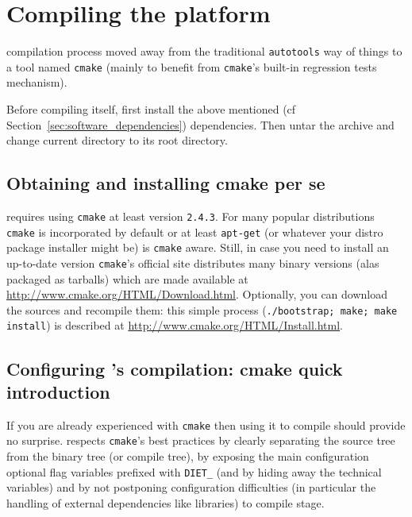 \section{Compiling the platform}
\label{sec:compil_platform}

\diet compilation process moved away from the traditional \verb+autotools+
way of things to a tool named \verb+cmake+ (mainly to benefit from
\verb+cmake+'s built-in regression tests mechanism).

Before compiling \diet itself, first install the above mentioned (cf
Section~\ref{sec:software_dependencies}) dependencies.  Then untar the
\diet archive and change current directory to its root directory.

\subsection{Obtaining and installing cmake per se}
\diet requires using \verb+cmake+ at least version \verb+2.4.3+.  For
many popular distributions \verb+cmake+ is incorporated by default or
at least \verb+apt-get+ (or whatever your distro package installer
might be) is \verb+cmake+ aware. Still, in case you need to install
an up-to-date version \verb+cmake+'s official site distributes many
binary versions (alas packaged as tarballs) which are made available
at \url{http://www.cmake.org/HTML/Download.html}. Optionally, you
can download the sources and recompile them: this simple process
(\verb+./bootstrap; make; make install+) is described at
\url{http://www.cmake.org/HTML/Install.html}.

\subsection{Configuring \diet's compilation: cmake quick introduction}
If you are already experienced with \verb+cmake+ then using it to
compile \diet should provide no surprise. \diet respects
\verb+cmake+'s best practices \eg by clearly separating the source
tree from the binary tree (or compile tree), by exposing the main
configuration optional flag variables prefixed with \verb+DIET_+ (and
by hiding away the technical variables) and by not postponing
configuration difficulties (in particular the handling of external
dependencies like libraries) to compile stage.

